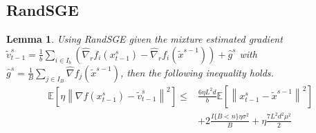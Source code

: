 \documentclass{article}
\newcommand*{\E}{\mathbb{E}}
\newcommand{\norm}[1]{\left\lVert#1\right\rVert}
\newtheorem{lemma}[theorem]{Lemma}
\theoremstyle{definition}
\theoremstyle{remark}
\begin{document}
\subsection{RandSGE}
\begin{lemma}\label{RandSGE-var-estimate-lem}
Using RandSGE given the mixture estimated gradient $\tilde{v}_{t-1}^s = \frac{1}{b} \sum_{i\in I_b}\left(\hat{\nabla}_r f_{i}(x_{t-1}^s)-\hat{\nabla}_r f_{i}(\tilde{x}^{s-1})\right)+\hat{g}^s$ with $\hat{g}^s = \frac{1}{B} \sum_{j\in I_B} \hat{\nabla} f_j (\tilde{x}^{s-1})$, then the following inequality holds. 
\begin{equation}
\begin{split}
\E\left[\eta\norm{\nabla f(x_{t-1}^s)-{\tilde{v}_{t-1}^s}}^2\right] \leq&  \frac{6\eta L^2 d}{b}\E\left[\norm{x_{t-1}^s-\tilde{x}^{s-1}}^2\right]\\
&+ 2\frac{I\{B < n\}\eta \sigma ^2}{B}+\eta \frac{7L^2 d^2 \mu^2}{2}
\end{split}
\end{equation}
\end{lemma}
\end{document}
